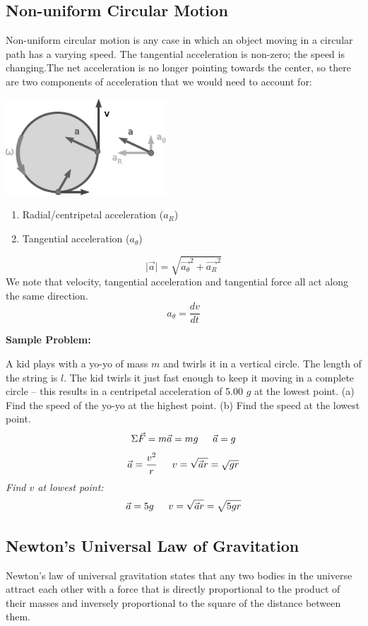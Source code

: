 \documentclass{article}
\begin{document}
\subsection{Non-uniform Circular Motion}
Non-uniform circular motion is any case in which an object moving in a circular path has a varying speed. The tangential acceleration is non-zero; the speed is changing.The net acceleration is no longer pointing towards the center, so there are two components of acceleration that we would need to account for:\vspace{1ex}
\begin{multicols}{2}
  \centerline{\includegraphics[width=6cm]{noncirc.png}}
  \columnbreak
  \begin{enumerate}
  \item Radial/centripetal acceleration ($a_R$)
  \item Tangential acceleration ($a_\theta$)
  \end{enumerate}
  \[
  \lvert\vec{a}\rvert=\sqrt{\vec{a_\theta}^2+\vec{a_R}^2}
  \]
  We note that velocity, tangential acceleration and tangential force all act along the same direction.
  \[
  a_\theta=\frac{dv}{dt}
  \]
\end{multicols}

\noindent\textbf{Sample Problem:}
\begin{multicols}{2}
  A kid plays with a yo-yo of mass $m$ and twirls it in a vertical circle.  The length of the string is $l$.  The kid twirls it just fast enough to keep it moving in a complete circle – this results in a centripetal acceleration of 5.00 $g$ at the lowest point. (a) Find the speed of the yo-yo at the highest point. (b) Find the speed at the lowest point.
  \vfill
  \columnbreak
  \[
  \Sigma\vec{F}=m\vec{a}=mg \indent
  \vec{a}=g
  \]
  \[
  \vec{a}=\frac{v^2}{r} \indent
  v=\sqrt{\vec{a}r}=\sqrt{gr}
  \]
  \textit{Find $v$ at lowest point:}
  \[
  \vec{a}=5g \indent
  v=\sqrt{\vec{a}r}=\sqrt{5gr}
  \]        
\end{multicols}

\subsection{Newton's Universal Law of Gravitation}
Newton's law of universal gravitation states that any two bodies in the universe attract each other with a force that is directly proportional to the product of their masses and inversely proportional to the square of the distance between them.
\end{document}
